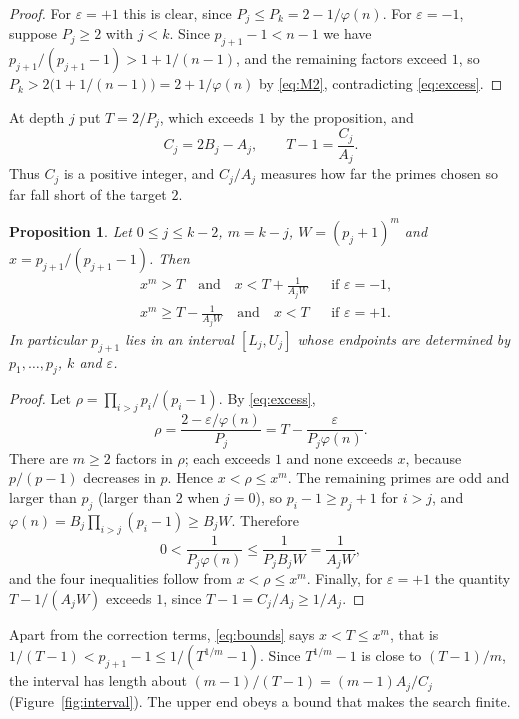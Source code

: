 \documentclass[11pt,reqno]{amsart}
\numberwithin{equation}{section}
\theoremstyle{plain}
\newtheorem{proposition}[theorem]{Proposition}
\theoremstyle{definition}
\theoremstyle{remark}
\begin{document}
\begin{proof}
For $\varepsilon=+1$ this is clear, since $P_j\le P_k=2-1/\varphi(n)$.
For $\varepsilon=-1$, suppose $P_j\ge2$ with $j<k$. Since
$p_{j+1}-1<n-1$ we have $p_{j+1}/(p_{j+1}-1)>1+1/(n-1)$, and the
remaining factors exceed $1$, so
$P_k>2\bigl(1+1/(n-1)\bigr)=2+1/\varphi(n)$ by \eqref{eq:M2},
contradicting \eqref{eq:excess}.
\end{proof}

At depth $j$ put $T=2/P_j$, which exceeds $1$ by the proposition, and
\[
  C_j=2B_j-A_j,\qquad T-1=\frac{C_j}{A_j}.
\]
Thus $C_j$ is a positive integer, and $C_j/A_j$ measures how far the
primes chosen so far fall short of the target $2$.

\begin{proposition}\label{prop:bounds}
Let $0\le j\le k-2$, $m=k-j$, $W=(p_j+1)^m$ and
$x=p_{j+1}/(p_{j+1}-1)$. Then
\begin{equation}\label{eq:bounds}
\begin{aligned}
  &x^m>T \quad\text{and}\quad x<T+\frac{1}{A_jW} &&\text{if }\varepsilon=-1,\\
  &x^m\ge T-\frac{1}{A_jW}\quad\text{and}\quad x<T &&\text{if }\varepsilon=+1 .
\end{aligned}
\end{equation}
In particular $p_{j+1}$ lies in an interval $[L_j,U_j]$ whose
endpoints are determined by $p_1,\dots,p_j$, $k$ and $\varepsilon$.
\end{proposition}

\begin{proof}
Let $\rho=\prod_{i>j}p_i/(p_i-1)$. By \eqref{eq:excess},
\[
  \rho=\frac{2-\varepsilon/\varphi(n)}{P_j}
  =T-\frac{\varepsilon}{P_j\varphi(n)} .
\]
There are $m\ge2$ factors in $\rho$; each exceeds $1$ and none exceeds
$x$, because $p/(p-1)$ decreases in $p$. Hence $x<\rho\le x^m$. The
remaining primes are odd and larger than $p_j$ (larger than $2$ when
$j=0$), so $p_i-1\ge p_j+1$ for $i>j$, and
$\varphi(n)=B_j\prod_{i>j}(p_i-1)\ge B_jW$. Therefore
\[
  0<\frac{1}{P_j\varphi(n)}\le\frac{1}{P_jB_jW}=\frac1{A_jW},
\]
and the four inequalities follow from $x<\rho\le x^m$. Finally, for
$\varepsilon=+1$ the quantity $T-1/(A_jW)$ exceeds $1$, since
$T-1=C_j/A_j\ge1/A_j$.
\end{proof}

Apart from the correction terms, \eqref{eq:bounds} says $x<T\le x^m$,
that is $1/(T-1)<p_{j+1}-1\le1/(T^{1/m}-1)$. Since
$T^{1/m}-1$ is close to $(T-1)/m$, the interval has length about
$(m-1)/(T-1)=(m-1)A_j/C_j$ (Figure~\ref{fig:interval}). The upper end
obeys a bound that makes the search finite.
\end{document}
